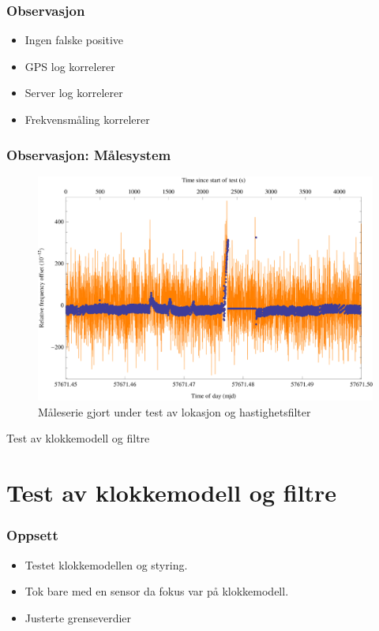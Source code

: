 \documentclass[xcolor=table]{beamer}
\begin{document}
\begin{frame}
\frametitle{Observasjon}
      \begin{itemize}
        \item Ingen falske positive
        \item GPS log korrelerer
        \item Server log korrelerer
        \item Frekvensmåling korrelerer
      \end{itemize}
\end{frame}

\begin{frame}
\frametitle{Observasjon: Målesystem}
      \begin{figure}
        \includegraphics[scale=0.70]{thesis/graphics/cns91-and-csac-telemetry-frequency-1.png}
        \caption{Måleserie gjort under test av lokasjon og hastighetsfilter}
      \end{figure}
\end{frame}

\begin{frame}
\centering
Test av klokkemodell og filtre
\end{frame}

\section{Test av klokkemodell og filtre}
\begin{frame}
\frametitle{Oppsett}
  \begin{itemize}
    \item Testet klokkemodellen og styring.
    \item Tok bare med en sensor da fokus var på klokkemodell.
    \item Justerte grenseverdier
  \end{itemize}
\end{frame}
\end{document}
